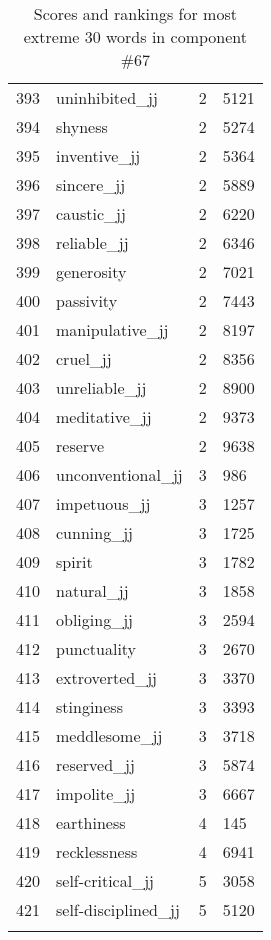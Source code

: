 \begin{longtable}[!htbp]{| rlr@{.}l |}
    393 & uninhibited\_jj & 2 & 5121 \\
    394 & shyness & 2 & 5274 \\
    395 & inventive\_jj & 2 & 5364 \\
    396 & sincere\_jj & 2 & 5889 \\
    397 & caustic\_jj & 2 & 6220 \\
    398 & reliable\_jj & 2 & 6346 \\
    399 & generosity & 2 & 7021 \\
    400 & passivity & 2 & 7443 \\
    401 & manipulative\_jj & 2 & 8197 \\
    402 & cruel\_jj & 2 & 8356 \\
    403 & unreliable\_jj & 2 & 8900 \\
    404 & meditative\_jj & 2 & 9373 \\
    405 & reserve & 2 & 9638 \\
    406 & unconventional\_jj & 3 & 986 \\
    407 & impetuous\_jj & 3 & 1257 \\
    408 & cunning\_jj & 3 & 1725 \\
    409 & spirit & 3 & 1782 \\
    410 & natural\_jj & 3 & 1858 \\
    411 & obliging\_jj & 3 & 2594 \\
    412 & punctuality & 3 & 2670 \\
    413 & extroverted\_jj & 3 & 3370 \\
    414 & stinginess & 3 & 3393 \\
    415 & meddlesome\_jj & 3 & 3718 \\
    416 & reserved\_jj & 3 & 5874 \\
    417 & impolite\_jj & 3 & 6667 \\
    418 & earthiness & 4 & 145 \\
    419 & recklessness & 4 & 6941 \\
    420 & self-critical\_jj & 5 & 3058 \\
    421 & self-disciplined\_jj & 5 & 5120 \\
    \hline
    \caption{Scores and rankings for most extreme 30 words in component \#67} \\
\end{longtable}
